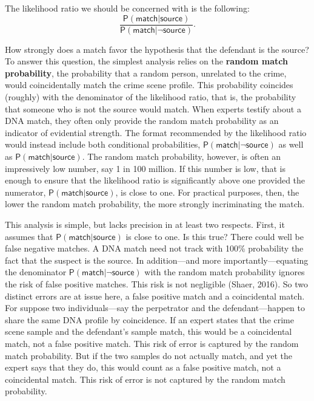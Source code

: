 \documentclass[
  10pt,
  dvipsnames,enabledeprecatedfontcommands]{scrartcl}
\newcommand{\pr}[1]{\mathsf{P}(#1)}
\begin{document}
The likelihood ratio we should be concerned with is the following:
\[\frac{\pr{\textsf{match} \vert \textsf{source}}}{\pr{\textsf{match} \vert \neg \textsf{source}}}.\]

\noindent How strongly does a match favor the hypothesis that the
defendant is the source? To answer this question, the simplest analysis
relies on the \textbf{random match probability}, the probability that a
random person, unrelated to the crime, would coincidentally match the
crime scene profile. This probability coincides (roughly) with the
denominator of the likelihood ratio, that is, the probability that
someone who is not the source would match. When experts testify about a
DNA match, they often only provide the random match probability as an
indicator of evidential strength. The format recommended by the
likelihood ratio would instead include both conditional probabilities,
\(\pr{\textsf{match} \vert \neg \textsf{source}}\) as well as
\(\pr{\textsf{match} \vert \textsf{source}}\). The random match
probability, however, is often an impressively low number, say 1 in 100
million. If this number is low, that is enough to ensure that the
likelihood ratio is significantly above one provided the numerator,
\(\pr{\textsf{match} \vert \textsf{source}}\), is close to one. For
practical purposes, then, the lower the random match probability, the
more strongly incriminating the match.

This analysis is simple, but lacks precision in at least two respects.
First, it assumes that \(\pr{\textsf{match} \vert \textsf{source}}\) is
close to one. Is this true? There could well be false negative matches.
A DNA match need not track with 100\% probability the fact that the
suspect is the source. In addition---and more importantly---equating the
denominator \(\pr{\textsf{match} \vert \neg \textsf{source}}\) with the
random match probability ignores the risk of false positive matches.
This risk is not negligible (Shaer, 2016). So two distinct errors are at
issue here, a false positive match and a coincidental match. For suppose
two individuals---say the perpetrator and the defendant---happen to
share the same DNA profile by coincidence. If an expert states that the
crime scene sample and the defendant's sample match, this would be a
coincidental match, not a false positive match. This risk of error is
captured by the random match probability. But if the two samples do not
actually match, and yet the expert says that they do, this would count
as a false positive match, not a coincidental match. This risk of error
is not captured by the random match probability.
\end{document}
